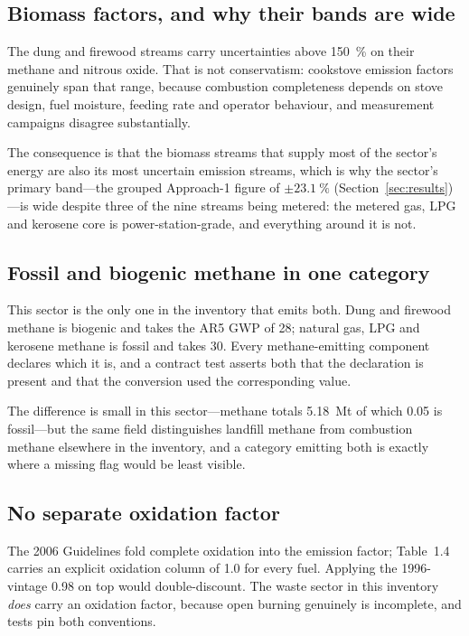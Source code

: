 \subsection{Biomass factors, and why their bands are wide}

The dung and firewood streams carry uncertainties above \SI{150}{\percent} on their methane and
nitrous oxide. That is not conservatism: cookstove emission factors genuinely span that range,
because combustion completeness depends on stove design, fuel moisture, feeding rate and
operator behaviour, and measurement campaigns disagree substantially.

The consequence is that the biomass streams that supply most of the sector's energy are also its most
uncertain emission streams, which is why the sector's primary band---the grouped Approach-1
figure of $\pm\SI{23.1}{\percent}$ (Section~\ref{sec:results})---is wide despite three of
the nine streams being metered: the metered gas, LPG and kerosene core is
power-station-grade, and everything around it is not.

\subsection{Fossil and biogenic methane in one category}

This sector is the only one in the inventory that emits both. Dung and firewood methane is
biogenic and takes the AR5 GWP of \num{28}; natural gas, LPG and kerosene methane is fossil and
takes \num{30}. Every methane-emitting component declares which it is, and a contract test
asserts both that the declaration is present and that the \COe{} conversion used the
corresponding value.

The difference is small in this sector---methane totals \SI{5.18}{\mega\tonne} \COe{} of which
\SI{0.05}{} is fossil---but the same field distinguishes landfill methane from combustion
methane elsewhere in the inventory, and a category emitting both is exactly where a missing
flag would be least visible.

\subsection{No separate oxidation factor}

The 2006 Guidelines fold complete oxidation into the emission factor; Table~1.4 carries an
explicit oxidation column of \num{1.0} for every fuel. Applying the 1996-vintage \num{0.98} on
top would double-discount. The waste sector in this inventory \emph{does} carry an oxidation
factor, because open burning genuinely is incomplete, and tests pin both conventions.
